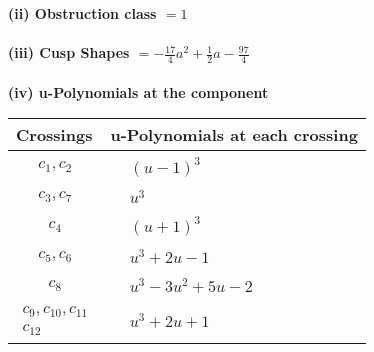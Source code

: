 \documentclass[1p]{elsarticle_modified}
\theoremstyle{definition}
\begin{document}
\flushleft \textbf{(ii) Obstruction class $= 1$}\\~\\
\flushleft \textbf{(iii) Cusp Shapes $= -\frac{17}{4} a^2+\frac{1}{2} a-\frac{97}{4}$}\\~\\
\newpage\renewcommand{\arraystretch}{1}
\flushleft \textbf{(iv) u-Polynomials at the component}\newline \\
\begin{tabular}{m{50pt}|m{274pt}}
Crossings & \hspace{64pt}u-Polynomials at each crossing \\
\hline $$\begin{aligned}c_{1},c_{2}\end{aligned}$$&$\begin{aligned}
&(u-1)^3
\end{aligned}$\\
\hline $$\begin{aligned}c_{3},c_{7}\end{aligned}$$&$\begin{aligned}
&u^3
\end{aligned}$\\
\hline $$\begin{aligned}c_{4}\end{aligned}$$&$\begin{aligned}
&(u+1)^3
\end{aligned}$\\
\hline $$\begin{aligned}c_{5},c_{6}\end{aligned}$$&$\begin{aligned}
&u^3+2 u-1
\end{aligned}$\\
\hline $$\begin{aligned}c_{8}\end{aligned}$$&$\begin{aligned}
&u^3-3 u^2+5 u-2
\end{aligned}$\\
\hline $$\begin{aligned}c_{9},c_{10},c_{11}\\c_{12}\end{aligned}$$&$\begin{aligned}
&u^3+2 u+1
\end{aligned}$\\
\hline
\end{tabular}\\~\\
\end{document}
